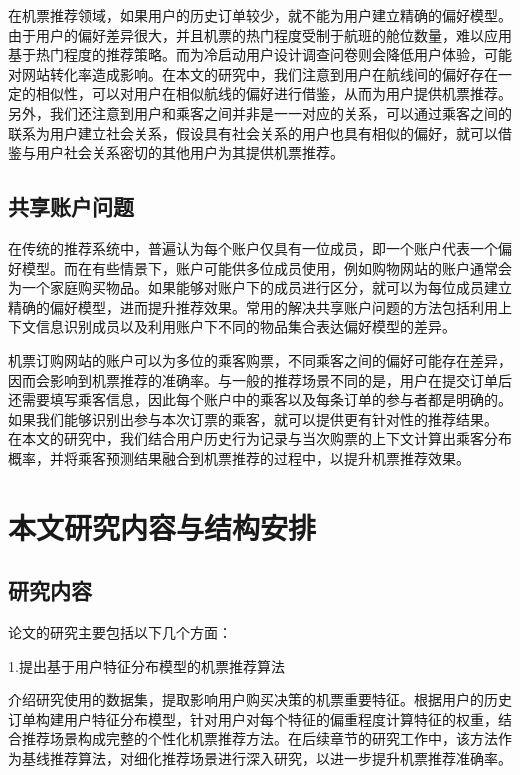 在机票推荐领域，如果用户的历史订单较少，就不能为用户建立精确的偏好模型。由于用户的偏好差异很大，并且机票的热门程度受制于航班的舱位数量，难以应用基于热门程度的推荐策略。而为冷启动用户设计调查问卷则会降低用户体验，可能对网站转化率造成影响。在本文的研究中，我们注意到用户在航线间的偏好存在一定的相似性，可以对用户在相似航线的偏好进行借鉴，从而为用户提供机票推荐。另外，我们还注意到用户和乘客之间并非是一一对应的关系，可以通过乘客之间的联系为用户建立社会关系\cite{sedhain2014social}，假设具有社会关系的用户也具有相似的偏好，就可以借鉴与用户社会关系密切的其他用户为其提供机票推荐。

\subsection{共享账户问题}

在传统的推荐系统中，普遍认为每个账户仅具有一位成员，即一个账户代表一个偏好模型\cite{kabutoya2010modeling}。而在有些情景下，账户可能供多位成员使用，例如购物网站的账户通常会为一个家庭购买物品。如果能够对账户下的成员进行区分，就可以为每位成员建立精确的偏好模型，进而提升推荐效果。常用的解决共享账户问题的方法包括利用上下文信息识别成员\cite{adomavicius2011context}以及利用账户下不同的物品集合\cite{verstrepen2015top}表达偏好模型的差异。

机票订购网站的账户可以为多位的乘客购票，不同乘客之间的偏好可能存在差异，因而会影响到机票推荐的准确率。与一般的推荐场景不同的是，用户在提交订单后还需要填写乘客信息，因此每个账户中的乘客以及每条订单的参与者都是明确的。如果我们能够识别出参与本次订票的乘客，就可以提供更有针对性的推荐结果。
在本文的研究中，我们结合用户历史行为记录与当次购票的上下文计算出乘客分布概率，并将乘客预测结果融合到机票推荐的过程中，以提升机票推荐效果。


\section{本文研究内容与结构安排}
\subsection{研究内容}
论文的研究主要包括以下几个方面：

1.提出基于用户特征分布模型的机票推荐算法

介绍研究使用的数据集，提取影响用户购买决策的机票重要特征。根据用户的历史订单构建用户特征分布模型，针对用户对每个特征的偏重程度计算特征的权重，结合推荐场景构成完整的个性化机票推荐方法。在后续章节的研究工作中，该方法作为基线推荐算法，对细化推荐场景进行深入研究，以进一步提升机票推荐准确率。

